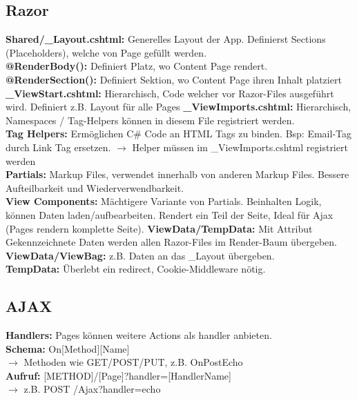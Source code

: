 \subsection{Razor}
\textcolor{b}{\textbf{Shared/\_Layout.cshtml:}} Generelles Layout der App. Definierst Sections (Placeholders), welche von Page gefüllt werden.\\
\textbf{@RenderBody():} Definiert Platz, wo Content Page rendert.\\
\textbf{@RenderSection():} Definiert Sektion, wo Content Page ihren Inhalt platziert\\
\textcolor{b}{\textbf{\_ViewStart.cshtml:}} Hierarchisch, Code welcher vor Razor-Files ausgeführt wird. Definiert z.B. Layout für alle Pages
\textcolor{b}{\textbf{\_ViewImports.cshtml:}} Hierarchisch, Namespaces / Tag-Helpers können in diesem File registriert werden.\\
\textcolor{b}{\textbf{Tag Helpers:}} Ermöglichen C\# Code an HTML Tags zu binden. Bsp: Email-Tag durch Link Tag ersetzen. $\rightarrow$ Helper müssen im \_ViewImports.cshtml registriert werden\\
\textcolor{b}{\textbf{Partials:}} Markup Files, verwendet innerhalb von anderen Markup Files. Bessere Aufteilbarkeit und Wiederverwendbarkeit.\\
\textcolor{b}{\textbf{View Components:}} Mächtigere Variante von Partials. Beinhalten Logik, können Daten laden/aufbearbeiten. Rendert ein Teil der Seite, Ideal für Ajax (Pages rendern komplette Seite).
\textcolor{b}{\textbf{ViewData/TempData:}} Mit Attribut Gekennzeichnete Daten werden allen Razor-Files im Render-Baum übergeben.\\
\textbf{ViewData/ViewBag:} z.B. Daten an das \_Layout übergeben.\\
\textbf{TempData:} Überlebt ein redirect, Cookie-Middleware nötig.
\subsection{AJAX}
\textcolor{b}{\textbf{Handlers:}} Pages können weitere Actions als handler anbieten.\\
\textbf{Schema:} On[Method][Name]\\
$\rightarrow$ Methoden wie GET/POST/PUT, z.B. OnPostEcho\\
\textbf{Aufruf:} [METHOD]/[Page]?handler=[HandlerName]\\
$\rightarrow$ z.B. POST /Ajax?handler=echo
